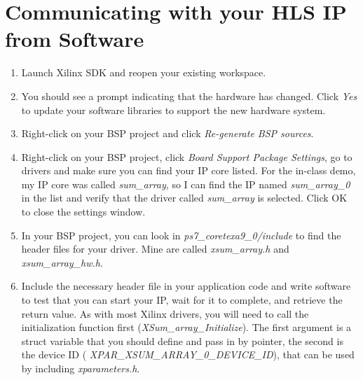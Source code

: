 \section{Communicating with your HLS IP from Software}
\begin{enumerate}
	\item Launch Xilinx SDK and reopen your existing workspace.
	\item You should see a prompt indicating that the hardware has changed.  Click \emph{Yes} to update your software libraries to support the new hardware system.
	\item Right-click on your BSP project and click \emph{Re-generate BSP sources}. 
	\item Right-click on your BSP project, click \emph{Board Support Package Settings}, go to drivers and make sure you can find your IP core listed.  For the in-class demo, my IP core was called \emph{sum\_array}, so I can find the IP named \emph{sum\_array\_0} in the list and verify that the driver called \emph{sum\_array} is selected. Click OK to close the settings window.
	\item In your BSP project, you can look in \emph{ps7\_coretexa9\_0/include} to find the header files for your driver.  Mine are called \emph{xsum\_array.h} and \emph{xsum\_array\_hw.h}.
	\item Include the necessary header file in your application code and write software to test that you can start your IP, wait for it to complete, and retrieve the return value.  As with most Xilinx drivers, you will need to call the initialization function first (\emph{XSum\_array\_Initialize}).  The first argument is a struct variable that you should define and pass in by pointer, the second is the device ID (\emph{ XPAR\_XSUM\_ARRAY\_0\_DEVICE\_ID}), that can be used by including \emph{xparameters.h}.
\end{enumerate}


\renewcommand*{\bibfont}{\footnotesize}
\printbibliography[heading=bibintoc]




